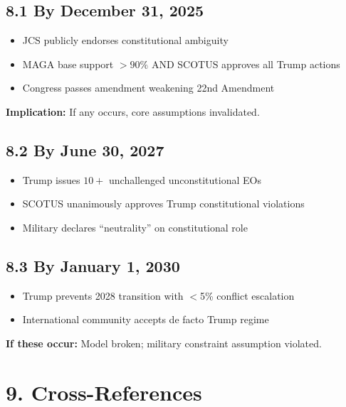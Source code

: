 \subsection{8.1 By December 31, 2025}

\begin{itemize}
\item[ ] JCS publicly endorses constitutional ambiguity
\item[ ] MAGA base support $> 90\%$ AND SCOTUS approves all Trump actions
\item[ ] Congress passes amendment weakening 22nd Amendment
\end{itemize}

\textbf{Implication:} If any occurs, core assumptions invalidated.

\subsection{8.2 By June 30, 2027}

\begin{itemize}
\item[ ] Trump issues $10+$ unchallenged unconstitutional EOs
\item[ ] SCOTUS unanimously approves Trump constitutional violations
\item[ ] Military declares ``neutrality'' on constitutional role
\end{itemize}

\subsection{8.3 By January 1, 2030}

\begin{itemize}
\item[ ] Trump prevents 2028 transition with $<$5\% conflict escalation
\item[ ] International community accepts de facto Trump regime
\end{itemize}

\textbf{If these occur:} Model broken; military constraint assumption violated.

\section{9. Cross-References}

